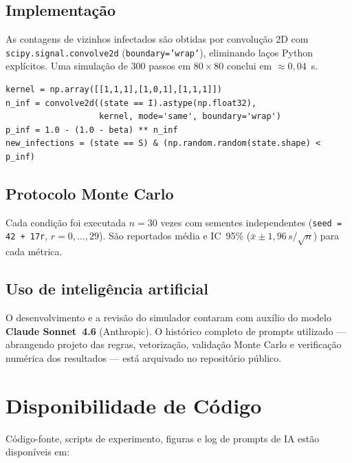 \documentclass[fleqn,10pt]{wlscirep}
\begin{document}
\subsection*{Implementa\c{c}\~{a}o}

As contagens de vizinhos infectados s\~{a}o obtidas por convolu\c{c}\~{a}o 2D com \texttt{scipy.signal.convolve2d} (\texttt{boundary='wrap'}), eliminando la\c{c}os Python expl\'{i}citos. Uma simula\c{c}\~{a}o de 300 passos em $80 \times 80$ conclui em $\approx 0{,}04$~s.

\begin{lstlisting}[caption={N\'{u}cleo da regra de atualiza\c{c}\~{a}o (Moore).}]
kernel = np.array([[1,1,1],[1,0,1],[1,1,1]])
n_inf = convolve2d((state == I).astype(np.float32),
                   kernel, mode='same', boundary='wrap')
p_inf = 1.0 - (1.0 - beta) ** n_inf
new_infections = (state == S) & (np.random.random(state.shape) < p_inf)
\end{lstlisting}

\subsection*{Protocolo Monte Carlo}

Cada condi\c{c}\~{a}o foi executada $n = 30$ vezes com sementes independentes (\texttt{seed = 42 + 17r}, $r = 0,\ldots,29$). S\~{a}o reportados m\'{e}dia e IC~95\% ($\bar{x} \pm 1{,}96\,s/\sqrt{n}$) para cada m\'{e}trica.

\subsection*{Uso de intelig\^{e}ncia artificial}

O desenvolvimento e a revis\~{a}o do simulador contaram com aux\'{i}lio do modelo \textbf{Claude Sonnet~4.6} (Anthropic). O hist\'{o}rico completo de prompts utilizado --- abrangendo projeto das regras, vetoriza\c{c}\~{a}o, valida\c{c}\~{a}o Monte Carlo e verifica\c{c}\~{a}o num\'{e}rica dos resultados --- est\'{a} arquivado no reposit\'{o}rio p\'{u}blico.

\section*{Disponibilidade de C\'{o}digo}

C\'{o}digo-fonte, scripts de experimento, figuras e log de prompts de IA est\~{a}o dispon\'{i}veis em:
\end{document}
